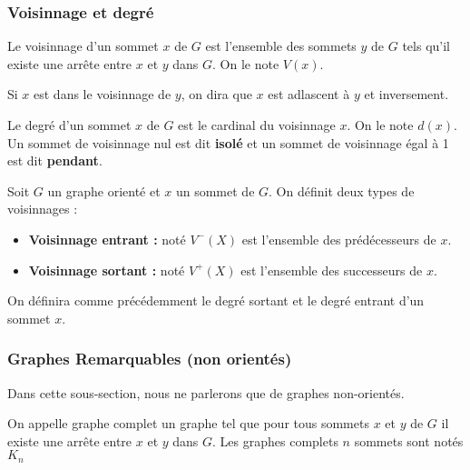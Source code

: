 \subsubsection{Voisinnage et degré}

\begin{definition}[Voisinnage]
    Le voisinnage d'un sommet $x$ de $G$ est l'ensemble des sommets $y$ de $G$ tels qu'il existe une arrête entre $x$ et $y$ dans $G$.
    On le note $V(x)$.
\end{definition}

\begin{remark}
    Si $x$ est dans le voisinnage de $y$, on dira que $x$ est adlascent à $y$ et inversement.
\end{remark}

\begin{definition}[Degré]
    Le degré d'un sommet $x$ de $G$ est le cardinal du voisinnage $x$. On le note $d(x)$.
    Un sommet de voisinnage nul est dit \textbf{isolé} et un sommet de voisinnage égal à 1 est dit \textbf{pendant}.
\end{definition}

\begin{definition}
    Soit $G$ un graphe orienté et $x$ un sommet de $G$. On définit deux types de voisinnages :
    \begin{itemize}
        \item \textbf{Voisinnage entrant :} noté $V^-(X)$ est l'ensemble des prédécesseurs de $x$.
        \item \textbf{Voisinnage sortant :} noté $V^+(X)$ est l'ensemble des successeurs de $x$.
    \end{itemize}
    On définira comme précédemment le degré sortant et le degré entrant d'un sommet $x$.
\end{definition}


\subsubsection{Graphes Remarquables (non orientés)}

Dans cette sous-section, nous ne parlerons que de graphes non-orientés.

\begin{definition}
    On appelle graphe complet un graphe tel que pour tous sommets $x$ et $y$ de $G$ il existe une arrête entre $x$ et $y$ dans $G$.
    Les graphes complets $n$ sommets sont notés $K_n$
\end{definition}

